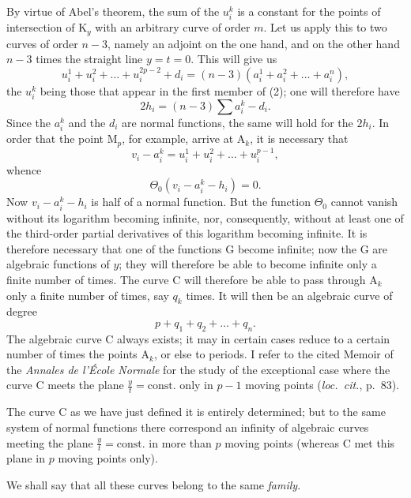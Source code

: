 \documentclass{article}
\begin{document}
By virtue of Abel's theorem, the sum of the $u_{i}^{k}$ is a constant for the points of intersection of $\mathrm{K}_{y}$ with an arbitrary curve of order $m$. Let us apply this to two curves of order $n - 3$, namely an adjoint on the one hand, and on the other hand $n - 3$ times the straight line $y = t = 0$. This will give us
\[
u_{i}^{1} + u_{i}^{2} + \ldots + u_{i}^{2p-2} + d_{i} = (n - 3)(a_{i}^{1} + a_{i}^{2} + \ldots + a_{i}^{n}),
\]
the $u_{i}^{k}$ being those that appear in the first member of (2); one will therefore have
\[
2h_{i} = (n - 3)\sum a_{i}^{k} - d_{i}.
\]
Since the $a_{i}^{k}$ and the $d_{i}$ are normal functions, the same will hold for the $2h_{i}$.
In order that the point $\mathrm{M}_{p}$, for example, arrive at $\mathrm{A}_{k}$, it is necessary that
\[
v_{i} - a_{i}^{k} = u_{i}^{1} + u_{i}^{2} + \ldots + u_{i}^{p-1},
\]
whence
\[
\Theta_{0}(v_{i} - a_{i}^{k} - h_{i}) = 0.
\]
Now $v_{i} - a_{i}^{k} - h_{i}$ is half of a normal function. But the function $\Theta_{0}$ cannot vanish without its logarithm becoming infinite, nor, consequently, without at least one of the third-order partial derivatives of this logarithm becoming infinite. It is therefore necessary that one of the functions $\mathrm{G}$ become infinite; now the $\mathrm{G}$ are algebraic functions of $y$; they will therefore be able to become infinite only a finite number of times. The curve $\mathrm{C}$ will therefore be able to pass through $\mathrm{A}_{k}$ only a finite number of times, say $q_{k}$ times. It will then be an algebraic curve of degree
\[
p + q_{1} + q_{2} + \ldots + q_{n}.
\]
The algebraic curve $\mathrm{C}$ always exists; it may in certain cases reduce to a certain number of times the points $\mathrm{A}_{k}$, or else to periods. I refer to the cited Memoir of the \emph{Annales de l'École Normale} for the study of the exceptional case where the curve $\mathrm{C}$ meets the plane $\frac{y}{t} = \mathrm{const.}$ only in $p - 1$ moving points (\emph{loc.~cit.}, p.~83).

The curve $\mathrm{C}$ as we have just defined it is entirely determined; but to the same system of normal functions there correspond an infinity of algebraic curves meeting the plane $\frac{y}{t} = \mathrm{const.}$ in more than $p$ moving points (whereas $\mathrm{C}$ met this plane in $p$ moving points only).

We shall say that all these curves belong to the same \emph{family}.
\end{document}
